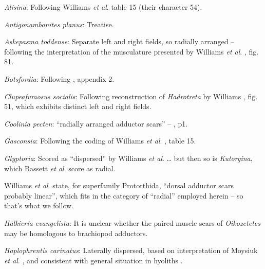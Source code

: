 \documentclass[openany]{book}
\theoremstyle{definition}
\theoremstyle{definition}
\theoremstyle{definition}
\theoremstyle{remark}
\begin{document}
\hypertarget{Alisina-coding-69}{}
\emph{Alisina}: Following Williams \emph{et al}.
\citeyearpar{Williams2000LinguliformeaCraniiformea} table 15 (their
character 54).

\hypertarget{Antigonambonites_planus-coding-69}{}
\emph{Antigonambonites planus}: Treatise.

\hypertarget{Askepasma_toddense-coding-69}{}
\emph{Askepasma toddense}: Separate left and right fields, so radially
arranged -- following the interpretation of the musculature presented by
Williams \emph{et al}.
\citeyearpar{Williams2000LinguliformeaCraniiformea}, fig. 81.

\hypertarget{Botsfordia-coding-69}{}
\emph{Botsfordia}: Following \citet{Williams1998Thediversity}, appendix
2.

\hypertarget{Clupeafumosus_socialis-coding-69}{}
\emph{Clupeafumosus socialis}: Following reconstruction of
\emph{Hadrotreta} by Williams
\citeyearpar{Williams2000LinguliformeaCraniiformea}, fig. 51, which
exhibits distinct left and right fields.

\hypertarget{Coolinia_pecten-coding-69}{}
\emph{Coolinia pecten}: ``radially arranged adductor scars'' --
\citet{Bassett2017Earliestontogeny}, p1.

\hypertarget{Gasconsia-coding-69}{}
\emph{Gasconsia}: Following the coding of Williams \emph{et al}.
\citeyearpar{Williams2000LinguliformeaCraniiformea}, table 15.

\hypertarget{Glyptoria-coding-69}{}
\emph{Glyptoria}: Scored as ``dispersed'' by Williams \emph{et al}.
\citeyearpar{Williams1998Thediversity} \ldots{} but then so is
\emph{Kutorgina}, which Bassett \emph{et al}.
\citeyearpar{Bassett2001Functionalmorphology} score as radial.

Williams \emph{et al}.
\citeyearpar{Williams2000LinguliformeaCraniiformea} state, for
superfamily Protorthida, ``dorsal adductor scars probably linear'',
which fits in the category of ``radial'' employed herein -- so that's
what we follow.

\hypertarget{Halkieria_evangelista-coding-69}{}
\emph{Halkieria evangelista}: It is unclear whether the paired muscle
scars of \emph{Oikozetetes} may be homologous to brachiopod adductors.

\hypertarget{Haplophrentis_carinatus-coding-69}{}
\emph{Haplophrentis carinatus}: Laterally dispersed, based on
interpretation of Moysiuk \emph{et al}.
\citeyearpar{Moysiuk2017Hyolithsare}, and consistent with general
situation in hyoliths \citep[see][]{Dzik1980Ontogenyof}.
\end{document}
